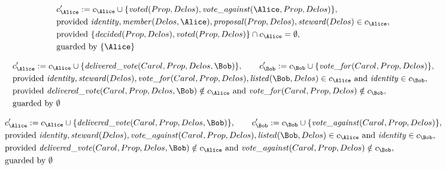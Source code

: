 \begin{align*}
&
c'_
{
\Alice
}
 := 
c_
{
\Alice
}
 \cup 
\{
\mathit{\detokenize{
voted
}}
(
Prop
,
Delos
)
,
\mathit{\detokenize{
vote_against
}}
(
\Alice
,
Prop
,
Delos
)
\}
,\\
&
\text{provided } 
\mathit{\detokenize{
identity
}}
,
\mathit{\detokenize{
member
}}
(
Delos
,
\Alice
)
,
\mathit{\detokenize{
proposal
}}
(
Prop
,
Delos
)
,
\mathit{\detokenize{
steward
}}
(
Delos
)
 \in c_
{
\Alice
}
,\\
&
\text{provided } 
\{
\mathit{\detokenize{
decided
}}
(
Prop
,
Delos
)
,
\mathit{\detokenize{
voted
}}
(
Prop
,
Delos
)
\}
 \cap c_
{
\Alice
}
 = \emptyset
,\\
&
\text{guarded by } \{
\Alice
\}
\end{align*}

\begin{align*}
&
c'_
{
\Alice
}
 := 
c_
{
\Alice
}
 \cup 
\{
\mathit{\detokenize{
delivered_vote
}}
(
Carol
,
Prop
,
Delos
,
\Bob
)
\}
, \qquad 
c'_
{
\Bob
}
 := 
c_
{
\Bob
}
 \cup 
\{
\mathit{\detokenize{
vote_for
}}
(
Carol
,
Prop
,
Delos
)
\}
,\\
&
\text{provided } 
\mathit{\detokenize{
identity
}}
,
\mathit{\detokenize{
steward
}}
(
Delos
)
,
\mathit{\detokenize{
vote_for
}}
(
Carol
,
Prop
,
Delos
)
,
\mathit{\detokenize{
listed
}}
(
\Bob
,
Delos
)
 \in c_
{
\Alice
}
 \text{ and } 
\mathit{\detokenize{
identity
}}
 \in c_
{
\Bob
}
,\\
&
\text{provided } 
\mathit{\detokenize{
delivered_vote
}}
(
Carol
,
Prop
,
Delos
,
\Bob
)
 \notin c_
{
\Alice
}
 \text{ and } 
\mathit{\detokenize{
vote_for
}}
(
Carol
,
Prop
,
Delos
)
 \notin c_
{
\Bob
}
,\\
&
\text{guarded by } \emptyset
\end{align*}

\begin{align*}
&
c'_
{
\Alice
}
 := 
c_
{
\Alice
}
 \cup 
\{
\mathit{\detokenize{
delivered_vote
}}
(
Carol
,
Prop
,
Delos
,
\Bob
)
\}
, \qquad 
c'_
{
\Bob
}
 := 
c_
{
\Bob
}
 \cup 
\{
\mathit{\detokenize{
vote_against
}}
(
Carol
,
Prop
,
Delos
)
\}
,\\
&
\text{provided } 
\mathit{\detokenize{
identity
}}
,
\mathit{\detokenize{
steward
}}
(
Delos
)
,
\mathit{\detokenize{
vote_against
}}
(
Carol
,
Prop
,
Delos
)
,
\mathit{\detokenize{
listed
}}
(
\Bob
,
Delos
)
 \in c_
{
\Alice
}
 \text{ and } 
\mathit{\detokenize{
identity
}}
 \in c_
{
\Bob
}
,\\
&
\text{provided } 
\mathit{\detokenize{
delivered_vote
}}
(
Carol
,
Prop
,
Delos
,
\Bob
)
 \notin c_
{
\Alice
}
 \text{ and } 
\mathit{\detokenize{
vote_against
}}
(
Carol
,
Prop
,
Delos
)
 \notin c_
{
\Bob
}
,\\
&
\text{guarded by } \emptyset
\end{align*}
